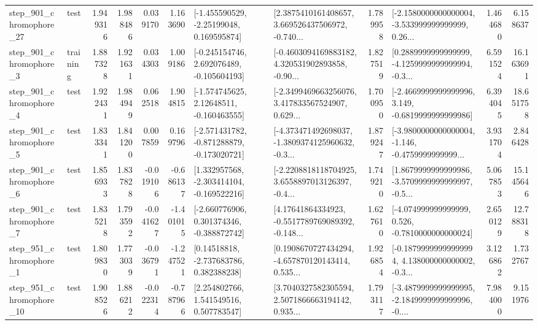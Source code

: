 \begin{tabular}{llrrrrllrlrr}
  step\_901\_chromophore\_27 &      test &      1.949316 &    1.988486 &      0.039170 &  1.163690 &    [-1.455590529, -2.25199048, 0.169595874] &  [2.3875410161408657, 3.669526437506972, -0.740... &       1.789958 &  [-2.1580000000000004, -3.533999999999999, 0.26... &            1.464680 &          6.158637 \\
   step\_901\_chromophore\_3 &  training &      1.887328 &    1.921631 &      0.034303 &  1.009186 &   [-0.245154746, 2.692076489, -0.105604193] &  [-0.4603094169883182, 4.320531902893858, -0.90... &       1.827519 &  [0.2889999999999999, -4.1259999999999994, -0.3... &            6.591524 &         16.163691 \\
   step\_901\_chromophore\_4 &      test &      1.922431 &    1.984949 &      0.062518 &  1.904815 &    [-1.574745625, 2.12648511, -0.160463555] &  [-2.3499469663256076, 3.417833567524907, 0.629... &       1.700950 &  [-2.4669999999999996, 3.149, -0.6819999999999986] &            6.394045 &         18.651758 \\
   step\_901\_chromophore\_5 &      test &      1.833341 &    1.841200 &      0.007859 &  0.169796 &  [-2.571431782, -0.871288879, -0.173020721] &  [-4.373471492698037, -1.3809374125960632, -0.3... &       1.879247 &  [-3.9800000000000004, -1.146, -0.4759999999999... &            3.931704 &          2.846428 \\
   step\_901\_chromophore\_6 &      test &      1.856933 &    1.837828 &     -0.019106 & -0.686137 &   [1.332957568, -2.303414104, -0.169522216] &  [-2.2208818118704925, 3.6558897013126397, -0.4... &       1.749210 &  [1.8679999999999986, -3.5709999999999997, -0.5... &            5.067853 &         15.145646 \\
   step\_901\_chromophore\_7 &      test &      1.835218 &    1.793592 &     -0.041627 & -1.401015 &   [-2.660776906, 0.301374346, -0.388872742] &  [4.17641864334923, -0.5517789769089392, -0.148... &       1.627610 &   [-4.074999999999999, 0.526, -0.7810000000000024] &            2.650129 &         12.788318 \\
   step\_951\_chromophore\_1 &      test &      1.809830 &    1.773039 &     -0.036791 & -1.247521 &     [0.14518818, -2.737683786, 0.382388238] &  [0.1908670727434294, -4.657870120143414, 0.535... &       1.926854 &  [-0.18799999999999994, 4.138000000000002, -0.3... &            3.126862 &          1.732767 \\
  step\_951\_chromophore\_10 &      test &      1.908526 &    1.886212 &     -0.022314 & -0.787966 &     [2.254802766, 1.541549516, 0.507783547] &  [3.7040327582305594, 2.5071866663194142, 0.935... &       1.793117 &  [-3.4879999999999995, -2.1849999999999996, -0.... &            7.984000 &          9.151976 \\

\end{tabular}
